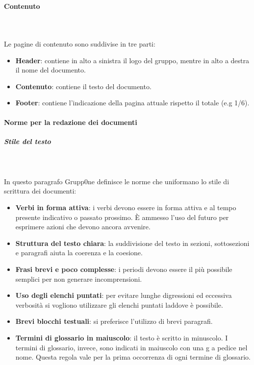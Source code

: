 \documentclass[../norme-di-progetto.tex]{subfiles}
\begin{document}
\paragraph{Contenuto}\mbox{}\\
\label{par:contenuto}
\\Le pagine di contenuto sono suddivise in tre parti:
\begin{itemize}
	\item \textbf{Header}: contiene in alto a sinistra il logo del gruppo, mentre in alto a destra il nome del documento.
	\item \textbf{Contenuto}: contiene il testo del documento.
	\item \textbf{Footer}: contiene l'indicazione della pagina attuale rispetto il totale (e.g 1/6).
\end{itemize}
\paragraph{Norme per la redazione dei documenti}
\label{par:norme per la redazione dei documenti}
\subparagraph{Stile del testo}\mbox{}\\
\label{subp:stile del testo}
\\In questo paragrafo Grupp0ne definisce le norme che uniformano lo stile di scrittura dei documenti:
\begin{itemize}
		\item \textbf{Verbi in forma attiva}: i verbi devono essere in forma attiva e al tempo presente indicativo o passato prossimo. È ammesso l'uso del futuro per esprimere azioni che devono ancora avvenire.
		\item \textbf{Struttura del testo chiara}: la suddivisione del testo in sezioni, sottosezioni e paragrafi aiuta la coerenza e la coesione.
		\item \textbf{Frasi brevi e poco complesse}: i periodi devono essere il più possibile semplici per non generare incomprensioni.
		\item \textbf{Uso degli elenchi puntati}: per evitare lunghe digressioni ed eccessiva verbosità si vogliono utilizzare gli elenchi puntati laddove è possibile.
		\item \textbf{Brevi blocchi testuali}: si preferisce l'utilizzo di brevi paragrafi.
		\item \textbf{Termini di glossario in maiuscolo}: il testo è scritto in minuscolo. I termini di glossario, invece, sono indicati in maiuscolo con una g a pedice nel nome. Questa regola vale per la prima occorrenza di ogni termine di glossario.
\end{itemize}
\end{document}
